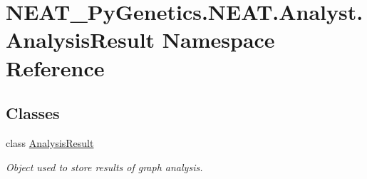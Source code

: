 \hypertarget{namespaceNEAT__PyGenetics_1_1NEAT_1_1Analyst_1_1AnalysisResult}{}\section{N\+E\+A\+T\+\_\+\+Py\+Genetics.\+N\+E\+A\+T.\+Analyst.\+Analysis\+Result Namespace Reference}
\label{namespaceNEAT__PyGenetics_1_1NEAT_1_1Analyst_1_1AnalysisResult}
\subsection*{Classes}
\begin{DoxyCompactItemize}
\item 
class \hyperlink{classNEAT__PyGenetics_1_1NEAT_1_1Analyst_1_1AnalysisResult_1_1AnalysisResult}{Analysis\+Result}
\begin{DoxyCompactList}\small\item\em Object used to store results of graph analysis. \end{DoxyCompactList}\end{DoxyCompactItemize}
